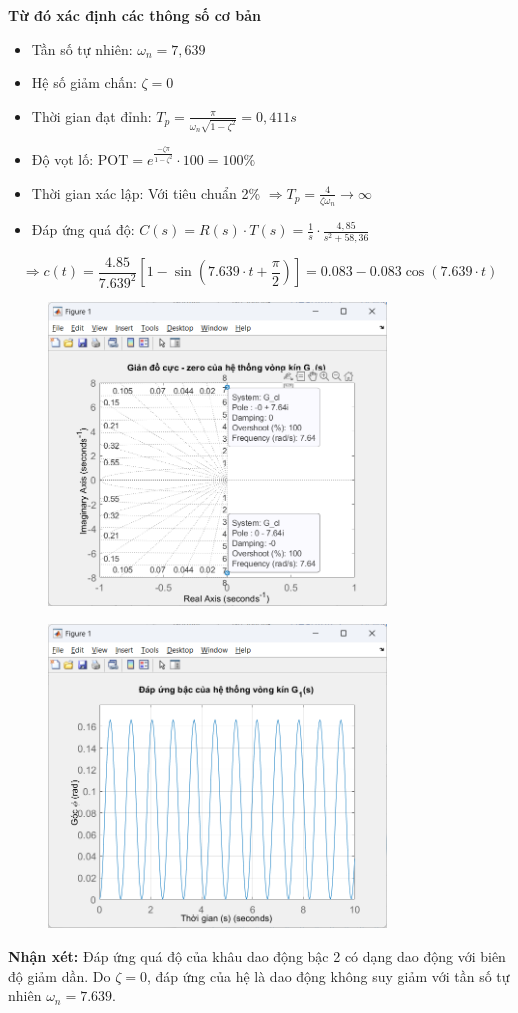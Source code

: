 \textbf{Từ đó xác định các thông số cơ bản }
\begin{itemize}
    \item Tần số tự nhiên: $\omega_n = 7{,}639$
    \item Hệ số giảm chấn: $\zeta = 0$
    \item Thời gian đạt đỉnh: $T_p = \frac{\pi}{\omega_n \sqrt{1 - \zeta^2}} = 0{,}411s$
    \item Độ vọt lố: $\text{POT} = e^{\frac{-\zeta \pi}{1-\zeta^2}} \cdot 100 = 100\%$
    \item Thời gian xác lập: Với tiêu chuẩn 2\% $\Rightarrow T_p = \frac{4}{\zeta \omega_n} \rightarrow \infty$
    \item Đáp ứng quá độ: $C(s) = R(s) \cdot T(s) = \frac{1}{s} \cdot \frac{4{,}85}{s^2 + 58{,}36}$
\end{itemize}
\[
\Rightarrow c(t) = \frac{4.85}{7.639^2} \left[1 - \sin(7.639 \cdot t + \frac{\pi}{2})\right] = 0.083 - 0.083 \cos(7.639 \cdot t)
\]
\begin{figure}[H]
    \centering
    \includegraphics[width=0.8\textwidth]{pictures/poleszeros.png}
\end{figure}
\begin{figure}[H]
    \centering
    \includegraphics[width=0.8\textwidth]{pictures/step.png}
\end{figure}
\textbf{Nhận xét:} Đáp ứng quá độ của khâu dao động bậc 2 có dạng dao động với biên độ giảm dần.
Do $\zeta = 0$, đáp ứng của hệ là dao động không suy giảm với tần số tự nhiên $\omega_n = 7.639$.